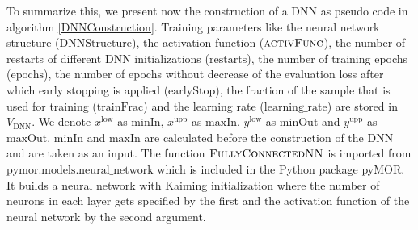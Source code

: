 To summarize this, we present now the construction of a DNN as pseudo code in algorithm \ref{DNNConstruction}. Training parameters like the neural network structure ($\mathrm{DNNStructure}$), the activation function ($\textproc{activFunc}$), the number of restarts of different DNN initializations ($\mathrm{restarts}$), the number of training epochs ($\mathrm{epochs}$), the number of epochs without decrease of the evaluation loss after which early stopping is applied ($\mathrm{earlyStop}$), the fraction of the sample that is used for training ($\mathrm{trainFrac}$) and the learning rate ($\mathrm{learning\_rate}$) are stored in $V_\mathrm{DNN}$. We denote $x^\mathrm{low}$ as $\mathrm{minIn}$, $x^\mathrm{upp}$ as $\mathrm{maxIn}$, $y^\mathrm{low}$ as $\mathrm{minOut}$ and $y^\mathrm{upp}$ as $\mathrm{maxOut}$. $\mathrm{minIn}$ and $\mathrm{maxIn}$ are calculated before the construction of the DNN and are taken as an input. The function $\textproc{FullyConnectedNN}$ is imported from $\mathrm{pymor.models.neural\_network}$ which is included in the Python package pyMOR. It builds a neural network with Kaiming initialization where the number of neurons in each layer gets specified by the first and the activation function of the neural network by the second argument.

